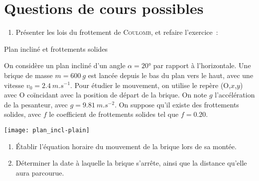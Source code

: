 \documentclass[a4paper, 12pt, final, garamond]{book}
\begin{document}
\section{Questions de cours possibles}
\begin{enumerate}[label=\sqenumi]
    \item Présenter les lois du frottement de \textsc{Coulomb}, et refaire
        l'exercice~:
\end{enumerate}
\begin{NCexem}[width=\linewidth]{Plan incliné et frottements solides}
    \begin{minipage}{0.6\linewidth}
        On considère un plan incliné d'un angle $\alpha = \ang{20;;}$ par
        rapport à l'horizontale. Une brique de masse $m = \SI{600}{g}$ est
        lancée depuis le bas du plan vers le haut, avec une vitesse $v_0 =
        \SI{2.4}{m.s^{-1}}$. Pour étudier le mouvement, on utilise le repère
        (O,$x$,$y$) avec O coïncidant avec la position de départ de la brique.
        On note $g$ l'accélération de la pesanteur, avec $g =
        \SI{9.81}{m.s^{-2}}$. On suppose qu'il existe des frottements solides,
        avec $f$ le coefficient de frottements solides tel que $f =
        \num{0.20}$.\bigbreak
    \end{minipage}
    \hfill
    \begin{minipage}{0.35\linewidth}
        \begin{center}
            \texttt{[image: plan\_incl-plain]}
        \end{center}
    \end{minipage}
    \begin{enumerate}
        \item Établir l'équation horaire du mouvement de la brique lors de
            sa montée.
        \item Déterminer la date à laquelle la brique s'arrête, ainsi que la
            distance qu'elle aura parcourue.
    \end{enumerate}
\end{NCexem}
\end{document}
